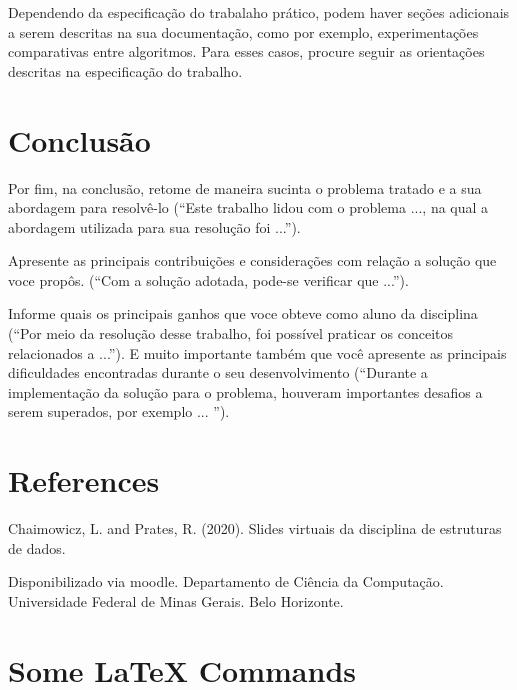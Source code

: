 \documentclass[11pt]{article}
\begin{document}
    \par Dependendo da especificação do trabalaho prático, podem haver seções adicionais a serem descritas na sua documentação, como por exemplo, experimentações comparativas entre algoritmos. Para esses casos, procure seguir as orientações descritas na especificação do trabalho.


\section{Conclusão}

    \par Por fim, na conclusão, retome de maneira sucinta o problema tratado e a sua abordagem para resolvê-lo (“Este trabalho lidou com o problema ..., na qual a abordagem utilizada para sua resolução foi ...”). 
    
    \par Apresente as principais contribuições e considerações com relação a solução que voce propôs. (“Com a solução adotada, pode-se verificar que ...”). 
    
    \par Informe quais os principais ganhos que voce obteve como aluno da disciplina (“Por meio da resolução desse trabalho, foi possível praticar os conceitos relacionados a ...”). E muito importante também que você apresente as principais dificuldades encontradas durante o seu desenvolvimento (“Durante a implementação da solução para o problema, houveram importantes desafios a serem superados, por exemplo ... ”).


\section*{References}

    \par Chaimowicz, L. and Prates, R. (2020). Slides virtuais da disciplina de estruturas de dados.
    
    \par Disponibilizado via moodle. Departamento de Ciência da Computação. Universidade Federal de Minas Gerais. Belo Horizonte.

\section*{Some LaTeX Commands}
\end{document}
